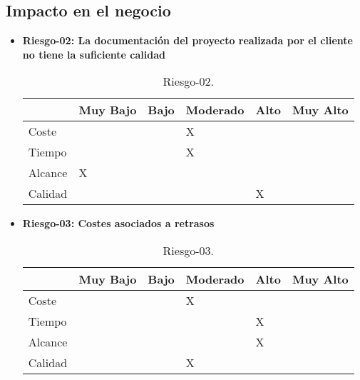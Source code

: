 \subsection{Impacto en el negocio}
\begin{itemize}
	\item \textbf{Riesgo-02: La documentación del proyecto realizada por el cliente no tiene la suficiente calidad}
	\begin{table}[H]
	\begin{center}
	\begin{tabular}{ l l l l l l }
	\hline
	& Muy Bajo & Bajo & Moderado & Alto & Muy Alto \\ \hline \hline
	Coste &  &  & X &  &  \\ \hline
	Tiempo &  &  & X &  &  \\ \hline
	Alcance & X &  &  &  &  \\ \hline
	Calidad &  &  &  & X &  \\ \hline
	\end{tabular}
	\caption{Riesgo-02.}
	\label{Riesgo-02}
	\end{center}
	\end{table}
	\item \textbf{Riesgo-03: Costes asociados a retrasos}
	\begin{table}[H]
	\begin{center}
	\begin{tabular}{ l l l l l l }
	\hline
	& Muy Bajo & Bajo & Moderado & Alto & Muy Alto \\ \hline \hline
	Coste &  &  & X &  &  \\ \hline
	Tiempo &  &  &  & X &  \\ \hline
	Alcance &  &  &  & X &  \\ \hline
	Calidad &  &  & X &  &  \\ \hline
	\end{tabular}
	\caption{Riesgo-03.}
	\label{Riesgo-03}
	\end{center}
	\end{table}
\end{itemize}

